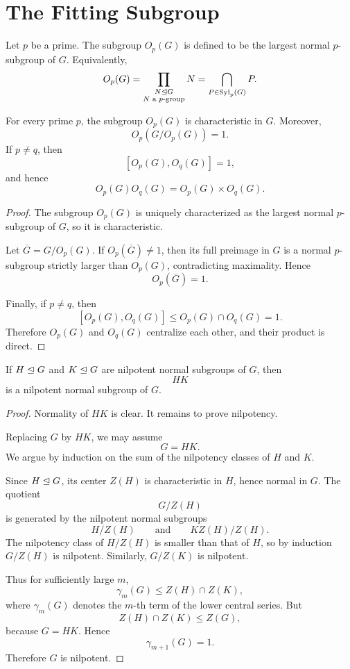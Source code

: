 \section{The Fitting Subgroup}

\begin{definition}
Let \(p\) be a prime. The subgroup \(O_p(G)\) is defined to be the largest
normal \(p\)-subgroup of \(G\). Equivalently,
\[
    O_p(G)
    =
    \prod_{\substack{N\trianglelefteq G\\ N\text{ a }p\text{-group}}}N
    =
    \bigcap_{P\in \operatorname{Syl}_p(G)}P.
\]
\end{definition}

\begin{proposition}
For every prime \(p\), the subgroup \(O_p(G)\) is characteristic in \(G\). Moreover,
\[
    O_p(G/O_p(G))=1.
\]
If \(p\neq q\), then
\[
    [O_p(G),O_q(G)]=1,
\]
and hence
\[
    O_p(G)O_q(G)=O_p(G)\times O_q(G).
\]
\end{proposition}

\begin{proof}
The subgroup \(O_p(G)\) is uniquely characterized as the largest normal
\(p\)-subgroup of \(G\), so it is characteristic.

Let \(\overline{G}=G/O_p(G)\). If \(O_p(\overline{G})\neq 1\), then its full
preimage in \(G\) is a normal \(p\)-subgroup strictly larger than \(O_p(G)\),
contradicting maximality. Hence
\[
    O_p(\overline{G})=1.
\]

Finally, if \(p\neq q\), then
\[
    [O_p(G),O_q(G)]\leq O_p(G)\cap O_q(G)=1.
\]
Therefore \(O_p(G)\) and \(O_q(G)\) centralize each other, and their product is
direct.
\end{proof}

\begin{lemma}
If \(H\trianglelefteq G\) and \(K\trianglelefteq G\) are nilpotent normal subgroups of \(G\), then
\[
    HK
\]
is a nilpotent normal subgroup of \(G\).
\end{lemma}

\begin{proof}
Normality of \(HK\) is clear. It remains to prove nilpotency.

Replacing \(G\) by \(HK\), we may assume
\[
    G=HK.
\]
We argue by induction on the sum of the nilpotency classes of \(H\) and \(K\).

Since \(H\trianglelefteq G\), its center \(Z(H)\) is characteristic in \(H\), hence normal
in \(G\). The quotient
\[
    G/Z(H)
\]
is generated by the nilpotent normal subgroups
\[
    H/Z(H)
    \qquad\text{and}\qquad
    KZ(H)/Z(H).
\]
The nilpotency class of \(H/Z(H)\) is smaller than that of \(H\), so by induction
\(G/Z(H)\) is nilpotent. Similarly, \(G/Z(K)\) is nilpotent.

Thus for sufficiently large \(m\),
\[
    \gamma_m(G)\leq Z(H)\cap Z(K),
\]
where \(\gamma_m(G)\) denotes the \(m\)-th term of the lower central series.
But
\[
    Z(H)\cap Z(K)\leq Z(G),
\]
because \(G=HK\). Hence
\[
    \gamma_{m+1}(G)=1.
\]
Therefore \(G\) is nilpotent.
\end{proof}

